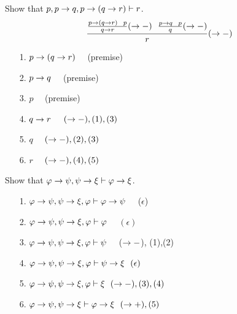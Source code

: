 \documentclass[english, 11pt]{article}
\begin{document}
\begin{defn}
    \begin{exmp}
      Show that $p, p \rightarrow q, p \rightarrow (q \rightarrow r) \vdash r$.
      \[ \f{\f{p \ar (q \ar r) \ \ p}{q \ar r} (\ar -) \ \ \f{p \ar q \ \ p}{q} (\ar -)}{r} (\ar -) \]
      \begin{itemize}
        \item[1.] $p \rightarrow (q \rightarrow r)$ \ \ (premise)
        \item[2.] $p \rightarrow q$ \ \ (premise)
        \item[3.] $p$ \ \ (premise)
        \item[4.] $q \rightarrow r$ \ \ $(\rightarrow -), (1), (3)$
        \item[5.] $q$ \ \ $(\rightarrow -),(2),(3)$
        \item[6.] $r$ \ \ $(\rightarrow -),(4),(5)$
      \end{itemize}
    \end{exmp}

    \begin{exmp}
      Show that $\varphi \rightarrow \psi, \psi \rightarrow \xi \vdash \varphi \rightarrow \xi$.
      \begin{itemize}
        \item[1.] $\varphi \rightarrow \psi, \psi \rightarrow \xi, \varphi \vdash \varphi \rightarrow \psi$ \ \ ($\epsilon$)
        \item[2.] $\varphi \rightarrow \psi, \psi \rightarrow \xi, \varphi \vdash \varphi$ \ \ $(\epsilon)$
        \item[3.] $\varphi \rightarrow \psi, \psi \rightarrow \xi, \varphi \vdash \psi$ \ \ ($\rightarrow -$), (1),(2)
        \item[4.] $\varphi \rightarrow \psi, \psi \rightarrow \xi, \varphi \vdash \psi \rightarrow \xi \ \ (\epsilon)$
        \item[5.] $\varphi \rightarrow \psi, \psi \rightarrow \xi, \varphi \vdash \xi \ \ (\rightarrow -), (3), (4)$
        \item[6.] $\varphi \rightarrow \psi, \psi \rightarrow \xi \vdash \varphi \rightarrow \xi \ \ (\rightarrow +), (5)$
      \end{itemize}
    \end{exmp}


\end{defn}
\end{document}
